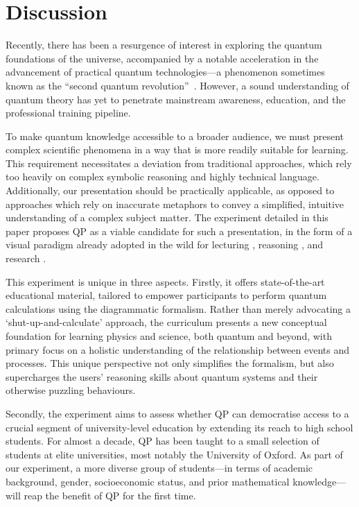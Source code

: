 
\section{Discussion}
\label{sec:discuss}

Recently, there has been a resurgence of interest in exploring the quantum foundations of the universe, accompanied by a notable acceleration in the advancement of practical quantum technologies---a phenomenon sometimes known as the ``second quantum revolution''~\cite{dowling2003quantum}. However, a sound understanding of quantum theory has yet to penetrate mainstream awareness, education, and the professional training pipeline.

To make quantum knowledge accessible to a broader audience, we must  present complex scientific phenomena in a way that is more readily suitable for learning. This requirement necessitates a deviation from traditional approaches, which rely too heavily on complex symbolic reasoning and highly technical language. Additionally, our presentation should be practically applicable, as opposed to approaches which rely on inaccurate metaphors to convey a simplified, intuitive understanding of a complex subject matter. The experiment detailed in this paper proposes QP \cite{ContPhys} as a viable candidate for such a presentation, in the form of a visual paradigm already adopted in the wild for lecturing \cite{CKbook, coecke2023basic}, reasoning \cite{van2020zx}, and research \cite{de2020fast, de2019techniques, kissinger2019reducing, de2020zx, kissinger2022phase, khesinGraphicalQuantumCliffordencoder2023}.

This experiment is unique in three aspects.
Firstly, it offers state-of-the-art educational material, tailored to empower participants to perform quantum calculations using the diagrammatic formalism. Rather than merely advocating a `shut-up-and-calculate' approach, the curriculum presents a new conceptual foundation for learning physics and science, both quantum and beyond, with primary focus on a holistic understanding of the relationship between events and processes.
This unique perspective not only simplifies the formalism, but also supercharges the users' reasoning skills about quantum systems and their otherwise puzzling behaviours.

Secondly, the experiment aims to assess whether QP can democratise access to a crucial segment of university-level education by extending its reach to high school students. For almost a decade, QP has been taught to a small selection of students at elite universities, most notably the University of Oxford. As part of our experiment, a more diverse group of students---in terms of academic background, gender, socioeconomic status, and prior mathematical knowledge---will reap the benefit of QP for the first time.

